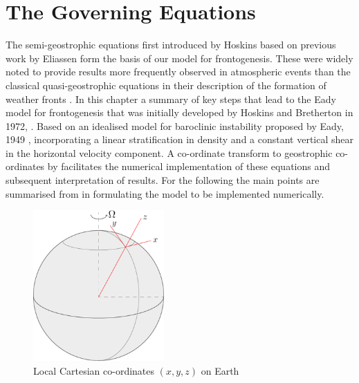 \chapter{The Governing Equations \label{governingequations}}
The semi-geostrophic equations first introduced by Hoskins \cite{Hoskins1975} based on previous work by Eliassen \cite{Eliassen1962}
form the basis of our model for frontogenesis. These were widely noted to provide results more frequently observed in atmospheric events than the classical quasi-geostrophic equations in their description of the formation of weather fronts \cite{Cullen2006a, Hoskins1975}. 
In this chapter a summary of key steps that lead to the Eady model for frontogenesis that was initially developed by Hoskins and Bretherton in 1972, \cite{Hoskins1972}. Based on an idealised model for baroclinic instability proposed by Eady, 1949 \cite{Eady}, incorporating a linear stratification in density and a constant vertical shear in the horizontal velocity component. A co-ordinate transform to geostrophic co-ordinates by \cite{Hoskins1975} 
facilitates the numerical implementation of these equations and subsequent interpretation of results. For the following the main points are summarised from \cite{Cullen2006a} in formulating the model to be implemented numerically.
\begin{figure}[h]
	\centering
	\includegraphics[width=5cm]{background/local_cartesian}
	\caption{Local Cartesian co-ordinates $\left(x,y,z\right)$ on Earth}
	\label{fig:localcartesian}
\end{figure} 
